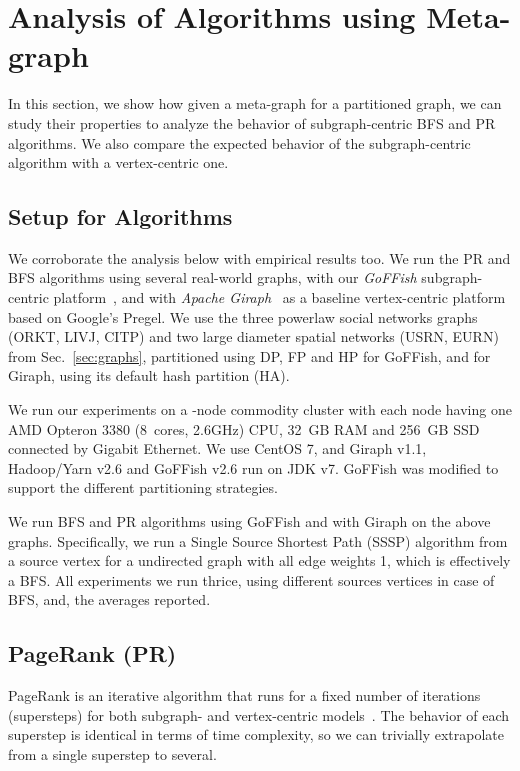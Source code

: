 \documentclass[10pt,conference, compsocconf]{IEEEtran}
\begin{document}
\section{Analysis of Algorithms using Meta-graph}\label{sec:algos}
In this section, we show how given a meta-graph for a partitioned graph, we can study their properties to analyze the behavior of subgraph-centric BFS and PR algorithms. We also compare the expected behavior of the subgraph-centric algorithm with a vertex-centric one.



\subsection{Setup for Algorithms}

We corroborate the analysis below with empirical results too. We run the PR and BFS algorithms using several real-world graphs, with our \emph{GoFFish} subgraph-centric platform~\cite{goffish}, and with \emph{Apache Giraph}~\cite{giraph} as a baseline vertex-centric platform based on Google's Pregel. We use the three powerlaw social networks graphs (ORKT, LIVJ, CITP) and two large diameter spatial networks (USRN, EURN) from Sec.~\ref{sec:graphs}, partitioned using DP, FP and HP for GoFFish, and for Giraph, using its default hash partition (HA).

 We run our experiments on a -node commodity cluster with each node having one AMD Opteron 3380 (8~cores, 2.6GHz) CPU, 32~GB RAM and 256~GB SSD connected by Gigabit Ethernet. We use CentOS 7, and Giraph v1.1, Hadoop/Yarn v2.6 and GoFFish v2.6 run on JDK v7. GoFFish was modified to support the different partitioning strategies. 

We run BFS and PR algorithms using GoFFish and with Giraph on the above graphs. Specifically, we run a Single Source Shortest Path (SSSP) algorithm from a source vertex for a undirected graph with all edge weights 1, which is effectively a BFS. All experiments we run thrice, using different sources vertices in case of BFS, and, the averages reported.



\subsection{PageRank (PR)}
PageRank is an iterative algorithm that runs for a fixed number of  iterations (supersteps) for both subgraph- and vertex-centric models~\cite{pregel, goffish}. The behavior of each superstep is identical in terms of time complexity, so we can trivially extrapolate from a single superstep to several. 
\end{document}
